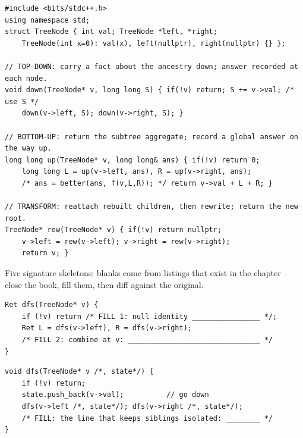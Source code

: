 \begin{lstlisting}[caption={Chapter 2 code kit: the three directions, one node each}, label={lst:c02-kit}]
#include <bits/stdc++.h>
using namespace std;
struct TreeNode { int val; TreeNode *left, *right;
    TreeNode(int x=0): val(x), left(nullptr), right(nullptr) {} };

// TOP-DOWN: carry a fact about the ancestry down; answer recorded at each node.
void down(TreeNode* v, long long S) { if(!v) return; S += v->val; /* use S */
    down(v->left, S); down(v->right, S); }

// BOTTOM-UP: return the subtree aggregate; record a global answer on the way up.
long long up(TreeNode* v, long long& ans) { if(!v) return 0;
    long long L = up(v->left, ans), R = up(v->right, ans);
    /* ans = better(ans, f(v,L,R)); */ return v->val + L + R; }

// TRANSFORM: reattach rebuilt children, then rewrite; return the new root.
TreeNode* rew(TreeNode* v) { if(!v) return nullptr;
    v->left = rew(v->left); v->right = rew(v->right);
    return v; }
\end{lstlisting}


Five signature skeletons; blanks come from listings that exist in the chapter --
close the book, fill them, then diff against the original.

\begin{lstlisting}[caption={Drill 1 -- structural skeleton (from \coderef{c02-skeleton})}]
Ret dfs(TreeNode* v) {
    if (!v) return /* FILL 1: null identity ________________ */;
    Ret L = dfs(v->left), R = dfs(v->right);
    /* FILL 2: combine at v: _______________________________ */
}
\end{lstlisting}

\begin{lstlisting}[caption={Drill 2 -- top-down with a shared trail (from \coderef{c02-td-skeleton})}]
void dfs(TreeNode* v /*, state*/) {
    if (!v) return;
    state.push_back(v->val);          // go down
    dfs(v->left /*, state*/); dfs(v->right /*, state*/);
    /* FILL: the line that keeps siblings isolated: ________ */
}
\end{lstlisting}

